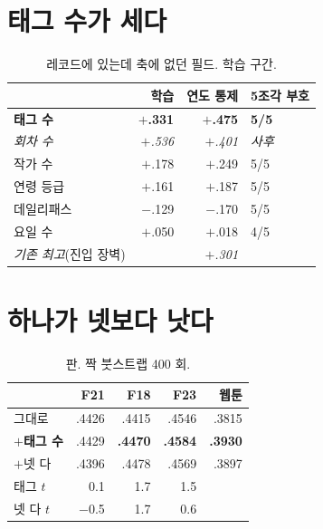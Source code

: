 \documentclass[10pt]{article}
\begin{document}

\section{태그 수가 세다}

\begin{table}[t]
\centering\tsize
\caption{레코드에 있는데 축에 없던 필드. 학습 구간.}
\begin{tabular}{lrrl}
\toprule
& 학습 & 연도 통제 & 5조각 부호 \\
\midrule
\textbf{태그 수} & \textbf{$+$.331} & \textbf{$+$.475} & \textbf{5/5} \\
\emph{회차 수} & \emph{$+$.536} & \emph{$+$.401} & \emph{사후} \\
작가 수 & $+$.178 & $+$.249 & 5/5 \\
연령 등급 & $+$.161 & $+$.187 & 5/5 \\
데일리패스 & $-$.129 & $-$.170 & 5/5 \\
요일 수 & $+$.050 & $+$.018 & 4/5 \\
\midrule
\emph{기존 최고}(진입 장벽) & & \emph{$+$.301} & \\
\bottomrule
\end{tabular}
\end{table}


\section{하나가 넷보다 낫다}

\begin{table}[t]
\centering\tsize
\caption{판. 짝 붓스트랩 400 회.}
\begin{tabular}{lrrrr}
\toprule
& F21 & F18 & F23 & 웹툰 \\
\midrule
그대로 & .4426 & .4415 & .4546 & .3815 \\
\textbf{$+$태그 수} & .4429 & \textbf{.4470} & \textbf{.4584} & \textbf{.3930} \\
$+$넷 다 & .4396 & .4478 & .4569 & .3897 \\
\midrule
태그 $t$ & 0.1 & 1.7 & 1.5 & \\
넷 다 $t$ & $-$0.5 & 1.7 & 0.6 & \\
\bottomrule
\end{tabular}
\end{table}
\end{document}
